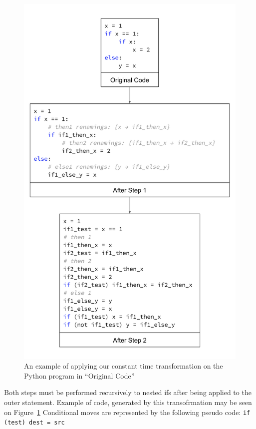 \documentclass[sigplan, review]{acmart}
\begin{document}
\begin{figure}[bhp]
\includegraphics[width=\columnwidth]{cmov_if_transofrmation.png}
\caption{ An example of applying our constant time transformation on the Python program in ``Original Code''}
\label{fig:cmov_if_transofrmation}
\end{figure}

Both steps must be performed recursively to nested ifs after being applied to the outer statement. Example of code, generated by this transofrmation may be seen on Figure~\ref{fig:cmov_if_transofrmation} Conditional moves are represented by the following pseudo code: \texttt{if (test) dest = src}
\end{document}
